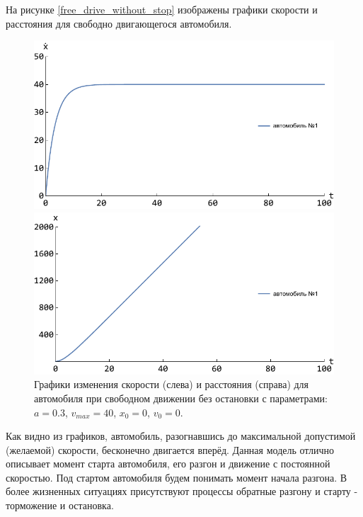 \documentclass[12pt, a4paper]{extarticle}
\numberwithin{equation}{section}
\begin{document}
На рисунке \eqref{free_drive_without_stop} изображены графики скорости и расстояния для свободно двигающегося автомобиля.
\begin{figure}[h!]
	\begin{center}
		\begin{minipage}[h!]{0.48\linewidth}
			\includegraphics[width=1\linewidth,height=0.2\textheight]
			{Images/free_drive_speed.pdf}
		\end{minipage}
		\hfill 
		\begin{minipage}[h!]{0.48\linewidth}
			\includegraphics[width=1\linewidth,height=0.2\textheight]
			{Images/free_drive_distance.pdf}
		\end{minipage}
		\caption{Графики изменения скорости (слева) и расстояния (справа) для автомобиля при свободном движении без остановки с параметрами: $a=0.3$, $v_{max}=40$, $x_0=0$, $v_0=0$.}
		\label{free_drive_without_stop}
	\end{center}
\end{figure}

Как видно из графиков, автомобиль, разогнавшись до максимальной допустимой (желаемой) скорости, бесконечно двигается вперёд. Данная модель отлично описывает момент старта автомобиля, его разгон и движение с постоянной скоростью. Под стартом автомобиля будем понимать момент начала разгона. В более жизненных ситуациях присутствуют процессы обратные разгону и старту - торможение и остановка.
\end{document}

